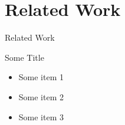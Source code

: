 \setlength{\parskip}{\baselineskip}
\section{Related Work}

\begin{frame}
	\huge Related Work
\end{frame}

\begin{frame}{Some Title}
	\begin{itemize}
		\item Some item 1
		\item Some item 2
		\item Some item 3
	\end{itemize}
\end{frame}
